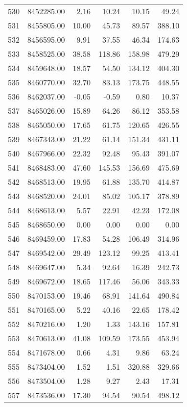 \begin{table}[ht]
\begin{tabular}{rrrrrr}
  530 & 8452285.00 & 2.16 & 10.24 & 10.15 & 49.24 \\ 
  531 & 8455805.00 & 10.00 & 45.73 & 89.57 & 388.10 \\ 
  532 & 8456595.00 & 9.91 & 37.55 & 46.34 & 174.63 \\ 
  533 & 8458525.00 & 38.58 & 118.86 & 158.98 & 479.29 \\ 
  534 & 8459648.00 & 18.57 & 54.50 & 134.12 & 404.30 \\ 
  535 & 8460770.00 & 32.70 & 83.13 & 173.75 & 448.55 \\ 
  536 & 8462037.00 & -0.05 & -0.59 & 0.80 & 10.37 \\ 
  537 & 8465026.00 & 15.89 & 64.26 & 86.12 & 353.58 \\ 
  538 & 8465050.00 & 17.65 & 61.75 & 120.65 & 426.55 \\ 
  539 & 8467343.00 & 21.22 & 61.14 & 151.34 & 431.11 \\ 
  540 & 8467966.00 & 22.32 & 92.48 & 95.43 & 391.07 \\ 
  541 & 8468483.00 & 47.60 & 145.53 & 156.69 & 475.69 \\ 
  542 & 8468513.00 & 19.95 & 61.88 & 135.70 & 414.87 \\ 
  543 & 8468520.00 & 24.01 & 85.02 & 105.17 & 378.89 \\ 
  544 & 8468613.00 & 5.57 & 22.91 & 42.23 & 172.08 \\ 
  545 & 8468650.00 & 0.00 & 0.00 & 0.00 & 0.00 \\ 
  546 & 8469459.00 & 17.83 & 54.28 & 106.49 & 314.96 \\ 
  547 & 8469542.00 & 29.49 & 123.12 & 99.25 & 413.41 \\ 
  548 & 8469647.00 & 5.34 & 92.64 & 16.39 & 242.73 \\ 
  549 & 8469672.00 & 18.65 & 117.46 & 56.06 & 343.33 \\ 
  550 & 8470153.00 & 19.46 & 68.91 & 141.64 & 490.84 \\ 
  551 & 8470165.00 & 5.22 & 40.16 & 22.65 & 178.42 \\ 
  552 & 8470216.00 & 1.20 & 1.33 & 143.16 & 157.81 \\ 
  553 & 8470613.00 & 41.08 & 109.59 & 173.55 & 453.94 \\ 
  554 & 8471678.00 & 0.66 & 4.31 & 9.86 & 63.24 \\ 
  555 & 8473404.00 & 1.52 & 1.51 & 320.88 & 329.66 \\ 
  556 & 8473504.00 & 1.28 & 9.27 & 2.43 & 17.31 \\ 
  557 & 8473536.00 & 17.30 & 94.54 & 90.54 & 498.12 \\ 

\end{tabular}
\end{table}
